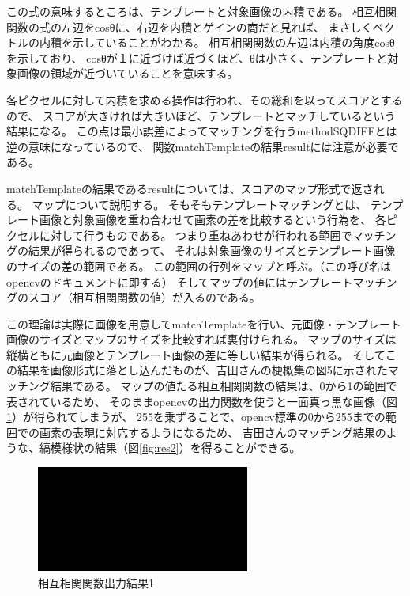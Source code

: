 \documentclass{jsarticle}
\begin{document}
\begin{multicols}{2}
この式の意味するところは、テンプレートと対象画像の内積である。
相互相関関数の式の左辺をcosθに、右辺を内積とゲインの商だと見れば、
まさしくベクトルの内積を示していることがわかる。
相互相関関数の左辺は内積の角度cosθを示しており、
cosθが１に近づけば近づくほど、θは小さく、テンプレートと対象画像の領域が近づいていることを意味する。

各ピクセルに対して内積を求める操作は行われ、その総和を以ってスコアとするので、
スコアが大きければ大きいほど、テンプレートとマッチしているという結果になる。
この点は最小誤差によってマッチングを行うmethodSQDIFFとは逆の意味になっているので、
関数matchTemplateの結果resultには注意が必要である。

matchTemplateの結果であるresultについては、スコアのマップ形式で返される。
マップについて説明する。
そもそもテンプレートマッチングとは、
テンプレート画像と対象画像を重ね合わせて画素の差を比較するという行為を、
各ピクセルに対して行うものである。
つまり重ねあわせが行われる範囲でマッチングの結果が得られるのであって、
それは対象画像のサイズとテンプレート画像のサイズの差の範囲である。
この範囲の行列をマップと呼ぶ。（この呼び名はopencvのドキュメント\cite{matchTemplateC}\cite{matchTemplatePy}に即する）
そしてマップの値にはテンプレートマッチングのスコア（相互相関関数の値）が入るのである。

この理論は実際に画像を用意してmatchTemplateを行い、元画像・テンプレート画像のサイズとマップのサイズを比較すれば裏付けられる。
マップのサイズは縦横ともに元画像とテンプレート画像の差に等しい結果が得られる。
そしてこの結果を画像形式に落とし込んだものが、吉田さんの梗概集の図5に示されたマッチング結果である。
マップの値たる相互相関関数の結果は、0から1の範囲で表されているため、
そのままopencvの出力関数を使うと一面真っ黒な画像（図\ref{fig:res}）が得られてしまうが、
255を乗ずることで、opencv標準の0から255までの範囲での画素の表現に対応するようになるため、
吉田さんのマッチング結果のような、縞模様状の結果（図\ref{fig:res2}）を得ることができる。

\begin{figure}[H]
  \begin{center}
    \includegraphics[clip,width=7.0cm]{./img/res.png}
    \caption{相互相関関数出力結果1}
    \label{fig:res}
  \end{center}
\end{figure}


\end{multicols}
\end{document}
